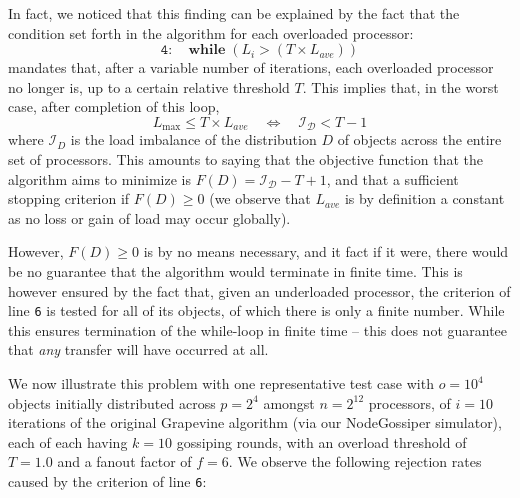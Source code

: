 In fact, we noticed that this finding can be explained by the fact
that the condition set forth in the algorithm for each overloaded
processor:
\[
\mathtt{4:} \quad \mathrm{\mathbf{while}} \; (L_i > (T \times L_{ave}))
\]
mandates that, after a variable number of iterations, each overloaded
processor no longer is, up to a certain relative threshold $T$.
This implies that, in the worst case, after completion of this loop,
\[
\label{eq:imbalance}
L_{\max} \le T \times L_{ave}
\quad \Longleftrightarrow \quad
\mathcal{I_D} < T - 1
\]
where $\mathcal{I}_D$ is the load imbalance of the distribution $D$ of
objects across the entire set of processors. This amounts to
saying that the objective function that the algorithm aims to minimize
is $F(D)=\mathcal{I_D}-T+1$, and that a sufficient stopping criterion
if $F(D)\ge0$ (we observe that $L_{ave}$ is by definition a constant
as no loss or gain of load may occur globally).

However, $F(D)\ge0$ is by no means necessary, and it fact if it were,
there would be no guarantee that the algorithm would terminate in
finite time. This is however ensured by the fact that, given an
underloaded processor, the criterion of line \texttt{6} is tested for
all of its objects, of which there is only a finite number.
While this ensures termination of the while-loop in finite time --
this does not guarantee that \emph{any} transfer will have occurred at
all.

We now illustrate this problem with one representative test case
with $o=10^4$ objects initially distributed across $p=2^4$
amongst $n=2^{12}$ processors, of $i=10$ iterations of the original
Grapevine algorithm (via our \textsf{NodeGossiper} simulator), each of
each having $k=10$ gossiping rounds, with an overload threshold of
$T=1.0$ and a fanout factor of $f=6$.
We observe the following rejection rates caused by the criterion of line \texttt{6}:


